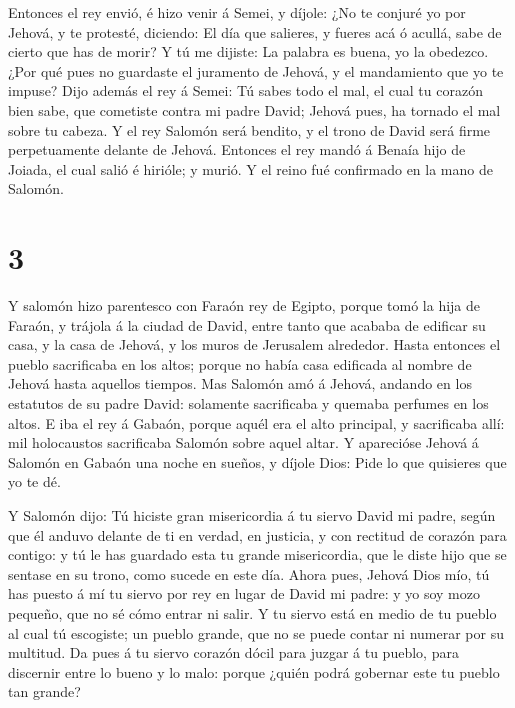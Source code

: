  Entonces el rey envió, é hizo venir á Semei, y díjole: ¿No
te conjuré yo por Jehová, y te protesté, diciendo: El día que salieres,
y fueres acá ó acullá, sabe de cierto que has de morir? Y tú me dijiste:
La palabra es buena, yo la obedezco.  ¿Por qué pues no
guardaste el juramento de Jehová, y el mandamiento que yo te impuse?
 Dijo además el rey á Semei: Tú sabes todo el mal, el cual
tu corazón bien sabe, que cometiste contra mi padre David; Jehová pues,
ha tornado el mal sobre tu cabeza.  Y el rey Salomón será
bendito, y el trono de David será firme perpetuamente delante de Jehová.
 Entonces el rey mandó á Benaía hijo de Joiada, el cual
salió é hirióle; y murió. Y el reino fué confirmado en la mano de
Salomón.

\hypertarget{section-2}{%
\section{3}\label{section-2}}

 Y salomón hizo parentesco con Faraón rey de Egipto, porque
tomó la hija de Faraón, y trájola á la ciudad de David, entre tanto que
acababa de edificar su casa, y la casa de Jehová, y los muros de
Jerusalem alrededor.  Hasta entonces el pueblo sacrificaba
en los altos; porque no había casa edificada al nombre de Jehová hasta
aquellos tiempos.  Mas Salomón amó á Jehová, andando en los
estatutos de su padre David: solamente sacrificaba y quemaba perfumes en
los altos.  E iba el rey á Gabaón, porque aquél era el alto
principal, y sacrificaba allí: mil holocaustos sacrificaba Salomón sobre
aquel altar.  Y aparecióse Jehová á Salomón en Gabaón una
noche en sueños, y díjole Dios: Pide lo que quisieres que yo te dé.

 Y Salomón dijo: Tú hiciste gran misericordia á tu siervo
David mi padre, según que él anduvo delante de ti en verdad, en
justicia, y con rectitud de corazón para contigo: y tú le has guardado
esta tu grande misericordia, que le diste hijo que se sentase en su
trono, como sucede en este día.  Ahora pues, Jehová Dios
mío, tú has puesto á mí tu siervo por rey en lugar de David mi padre: y
yo soy mozo pequeño, que no sé cómo entrar ni salir.  Y tu
siervo está en medio de tu pueblo al cual tú escogiste; un pueblo
grande, que no se puede contar ni numerar por su multitud. 
Da pues á tu siervo corazón dócil para juzgar á tu pueblo, para
discernir entre lo bueno y lo malo: porque ¿quién podrá gobernar este tu
pueblo tan grande?

